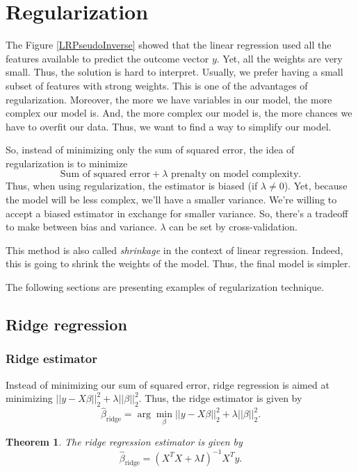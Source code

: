 \documentclass[a4paper,12pt]{article}
\newtheorem*{thm}{Theorem}
\begin{document}
\section{Regularization}
The Figure \ref{LRPseudoInverse} showed that the linear regression used all the features available to predict the outcome vector $y$. Yet, all the weights are very small. Thus, the solution is hard to interpret. Usually, we prefer having a small subset of features with strong weights. This is one of the advantages of regularization. Moreover, the more we have variables in our model, the more complex our model is. And, the more complex our model is, the more chances we have to overfit our data. Thus, we want to find a way to simplify our model.

 So, instead of minimizing only the sum of squared error, the idea of regularization is to minimize
 \[ \text{Sum of squared error} + \lambda \text{ prenalty on model complexity}.\]
Thus, when using regularization, the estimator is biased (if $\lambda \not = 0$). Yet, because the model will be less complex, we'll have a smaller variance. We're willing to accept a biased estimator in exchange for smaller variance. So, there's a tradeoff to make between bias and variance. $\lambda$ can be set by cross-validation. \label{CVlambda}

This method is also called \emph{shrinkage} in the context of linear regression. Indeed, this is going to shrink the weights of the model. Thus, the final model is simpler.

The following sections are presenting examples of regularization technique.

\subsection{Ridge regression}
\subsubsection{Ridge estimator}
Instead of minimizing our sum of squared error, ridge regression is aimed at minimizing $||y - X\beta||_2^2 + \lambda ||\beta||_2^2$. Thus, the ridge estimator is given by
\[ \hat{\beta}_\text{ridge} = \arg \min_\beta ||y - X\beta||_2^2 + \lambda ||\beta||_2^2. \]

\begin{thm} The ridge regression estimator is given by
\[ \hat{\beta}_\text{ridge} = (X^T X+ \lambda I)^{-1} X^T y. \]
\end{thm}
\end{document}
